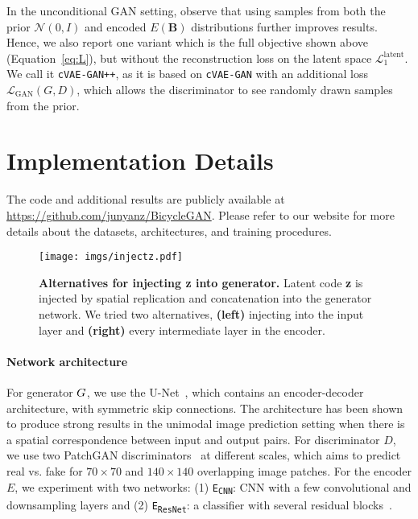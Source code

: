 \documentclass{article}
\newcommand{\cvaegan}{\texttt{cVAE-GAN}\xspace}
\newcommand{\cvaeganp}{\texttt{cVAE-GAN++}\xspace}
\newcommand{\D}{D\xspace}
\newcommand{\E}{E\xspace}
\newcommand{\B}{\mathbf{B}\xspace}
\begin{document}
In the unconditional GAN setting, \citet{larsen2016vaegan} observe that using samples from both the prior $\mathcal{N}(0,I)$ and encoded $\E(\B)$ distributions further improves results.
Hence, we also report one variant which is the full objective shown above (Equation~\ref{eq:L}), but without the reconstruction loss on the latent space $\mathcal{L}_1^{\text{latent}}$. 
We call it \cvaeganp, as it is based on \cvaegan with an additional loss $\mathcal{L}_{\text{GAN}}(G, D)$, which allows the discriminator to see randomly drawn samples from the prior.
\vspace{-2mm} 
\section{Implementation Details}
\label{sec:implementation}
The code and additional results are publicly available at \url{https://github.com/junyanz/BicycleGAN}. Please refer to our website for more details about the datasets, architectures, and training procedures.
\begin{figure}
\centering
\texttt{[image: imgs/injectz.pdf]}
\caption{\small \textbf{Alternatives for injecting {\bf z} into generator.} Latent code \textbf{z} is injected by spatial replication and concatenation into the generator network. We tried two alternatives, {\bf (left)} injecting into the input layer and {\bf (right)} every intermediate layer in the encoder.}
\vspace{-4mm}
\label{fig:addz}
\end{figure}

\paragraph{Network architecture} For generator $G$, we use the U-Net~\citep{ronneberger2015u}, which contains an encoder-decoder architecture, with symmetric skip connections. The architecture has been shown to produce strong results in the unimodal image prediction setting when there is a spatial correspondence between input and output pairs. For discriminator $\D$, we use two PatchGAN discriminators~\citep{isola2016image} at different scales, which aims to predict real vs. fake for $70\times 70$ and $140 \times 140$ overlapping image patches. For the encoder $\E$, we experiment with two networks: (1) \texttt{E\textsubscript{CNN}}: CNN with a few convolutional and downsampling layers and (2) \texttt{E\textsubscript{ResNet}}: a classifier with several residual blocks~\cite{he2016deep}.
\end{document}
